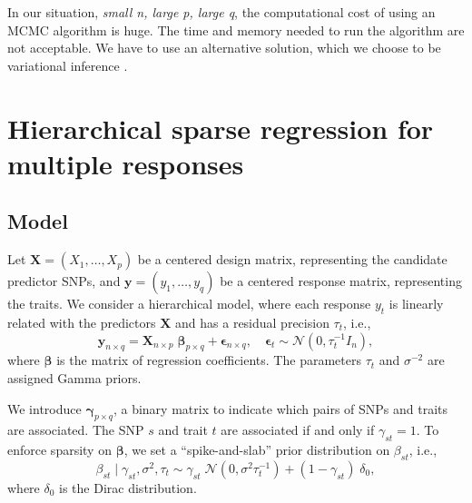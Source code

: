 \documentclass[a4paper, 11pt]{report}
\numberwithin{equation}{chapter}
\begin{document}
In our situation, \textit{small n, large p, large q}, the computational cost of using an MCMC algorithm is huge. The time and memory needed to run the algorithm are not acceptable. We have to use an alternative solution, which we choose to be variational inference \citet{varInf}. 

\newpage
\chapter{Hierarchical sparse regression for multiple responses}
\section{Model}
Let $\boldsymbol{X }= (X_1,\ldots,X_p)$ be a centered design matrix, representing the candidate predictor SNPs, and $\boldsymbol{y} = (y_1,\ldots,y_q)$ be a centered response matrix, representing the traits. We consider a hierarchical model, where each response $y_t$ is linearly related with the predictors $\boldsymbol{X}$ and has a residual precision $\tau_t$, i.e.,
\begin{equation*}
\label{eq:model}
\boldsymbol{y}_{n\times q} = \boldsymbol{X}_{n \times p}\;\boldsymbol{\beta}_{p \times q}+\boldsymbol{\epsilon}_{n \times q},\quad\boldsymbol{\epsilon}_t \sim \mathcal{N}(0,\tau_t^{-1}I_n),
\end{equation*}
where $\boldsymbol{\beta}$ is the matrix of regression coefficients. The parameters $\tau_t$ and $\sigma^{-2}$ are assigned Gamma priors.

We introduce $\boldsymbol{\gamma}_{p\times q}$, a binary matrix to indicate which pairs of SNPs and traits are associated. The SNP $s$ and trait $t$ are associated if and only if $\gamma_{st} = 1$. To enforce sparsity on $\boldsymbol{\beta}$, we set a ``spike-and-slab'' prior distribution on $\beta_{st}$, i.e.,
\begin{equation*}
\beta_{st} \mid \gamma_{st},\sigma^2, \tau_t \sim \gamma_{st}\;\mathcal{N}(0,\sigma^2\tau_t^{-1})+(1-\gamma_{st})\;\delta_0,
\end{equation*}
where $\delta_0$ is the Dirac distribution.
\end{document}

